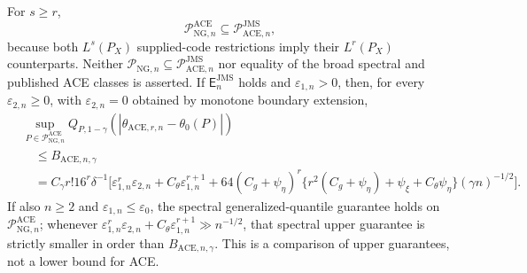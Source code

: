 For \(s\ge r\),
\[
 \mathcal P_{\mathrm{NG},n}^{\mathrm{ACE}}
 \subseteq\mathcal P_{\mathrm{ACE},n}^{\mathrm{JMS}},
\]
because both \(L^s(P_X)\) supplied-code restrictions imply their \(L^r(P_X)\) counterparts. Neither \(\mathcal P_{\mathrm{NG},n}\subseteq\mathcal P_{\mathrm{ACE},n}^{\mathrm{JMS}}\) nor equality of the broad spectral and published ACE classes is asserted. If \(\mathsf E_n^{\mathrm{JMS}}\) holds and \(\varepsilon_{1,n}>0\), then, for every \(\varepsilon_{2,n}\ge0\), with \(\varepsilon_{2,n}=0\) obtained by monotone boundary extension,
\[
\begin{aligned}
 &\sup_{P\in\mathcal P_{\mathrm{NG},n}^{\mathrm{ACE}}}
 Q_{P,1-\gamma}(|\widehat\theta_{\mathrm{ACE},r,n}-\theta_0(P)|)\\
 &\quad\le B_{\mathrm{ACE},n,\gamma}\\
 &\quad=C_{\gamma}r!16^r\delta^{-1}
 \Big[\varepsilon_{1,n}^r\varepsilon_{2,n}
 +C_{\theta}\varepsilon_{1,n}^{r+1}
 +64(C_g+\psi_{\eta})^r
 \{r^2(C_g+\psi_{\eta})+\psi_{\xi}+C_{\theta}\psi_{\eta}\}
 (\gamma n)^{-1/2}\Big].
\end{aligned}
\]
If also \(n\ge2\) and \(\varepsilon_{1,n}\le\varepsilon_0\), the spectral generalized-quantile guarantee holds on \(\mathcal P_{\mathrm{NG},n}^{\mathrm{ACE}}\); whenever \(\varepsilon_{1,n}^r\varepsilon_{2,n}+C_{\theta}\varepsilon_{1,n}^{r+1}\gg n^{-1/2}\), that spectral upper guarantee is strictly smaller in order than \(B_{\mathrm{ACE},n,\gamma}\). This is a comparison of upper guarantees, not a lower bound for ACE.